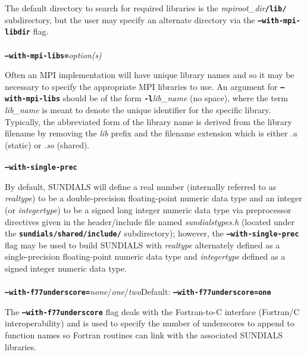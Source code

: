\documentclass[10pt]{report}
\begin{document}
The default directory to search for required libraries is the \textit{mpiroot\_dir}\texttt{\textbf{/lib/}} subdirectory, but the user may specify an alternate directory via the \texttt{\textbf{--with-mpi-libdir}} flag.
\\
\\ 
\texttt{\textbf{--with-mpi-libs=}}\textit{option(s)}\vspace{0.05in}

Often an MPI implementation will have unique library names and so it may be necessary to specify the appropriate \small MPI \normalsize libraries to use.  An argument for \texttt{\textbf{--with-mpi-libs}} should be of the form \texttt{\textbf{-l}}\textit{lib\_name} (no space), where the term \textit{lib\_name} is meant to denote the unique identifier for the specific library.  Typically, the abbreviated form of the library name is derived from the library filename by removing the \textit{lib} prefix and the filename extension which is either .\textit{a} (static) or .\textit{so} (shared).
\\
\\
\texttt{\textbf{--with-single-prec}}\vspace{0.05in}

By default, \small SUNDIALS \normalsize will define a real number (internally referred to as \textit{realtype}) to be a double-precision floating-point numeric data type and an integer (or \textit{integertype}) to be a signed long integer numeric data type via preprocessor directives given in the header/include file named \textit{sundialstypes.h} (located under the \texttt{\textbf{sundials/shared/include/}} subdirectory); however, the \texttt{\textbf{--with-single-prec}} flag may be used to build \small SUNDIALS \normalsize with \textit{realtype} alternately defined as a single-precision floating-point numeric data type and \textit{integertype} defined as a signed integer numeric data type.
\\
\\
\texttt{\textbf{--with-f77underscore=}}\textit{none}/\textit{one}/\textit{two}\hspace{0.5in}Default: \texttt{\textbf{--with-f77underscore=one}}\vspace{0.05in}

The \texttt{\textbf{--with-f77underscore}} flag deals with the Fortran-to-C interface (Fortran/C interoperability) and is used to specify the number of underscores to append to function names so Fortran routines can link with the associated \small SUNDIALS \normalsize libraries.
\end{document}
